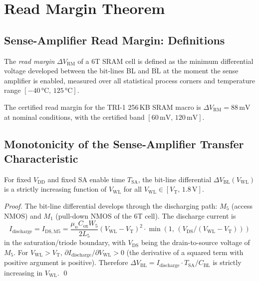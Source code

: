 \section{Read Margin Theorem}
\label{sec:wlboost-read-margin}

\subsection{Sense-Amplifier Read Margin: Definitions}

\begin{definition}
\label{def:read-margin}
The \emph{read margin} $\Delta V_{\mathrm{RM}}$ of a 6T SRAM cell is
defined as the minimum differential voltage developed between the
bit-lines BL and $\overline{\text{BL}}$ at the moment the sense
amplifier is enabled, measured over all statistical process corners
and temperature range $[-40\,\text{°C},\, 125\,\text{°C}]$.
\end{definition}

The certified read margin for the TRI-1 256\,KB SRAM macro is
$\Delta V_{\mathrm{RM}} = 88\,\text{mV}$ at nominal conditions, with
the certified band $[60\,\text{mV},\, 120\,\text{mV}]$.

\subsection{Monotonicity of the Sense-Amplifier Transfer Characteristic}

\begin{lemma}
\label{lem:monotone}
For fixed $V_{\mathrm{DD}}$ and fixed SA enable time $T_{\mathrm{SA}}$,
the bit-line differential $\Delta V_{\mathrm{BL}}(V_{\mathrm{WL}})$
is a strictly increasing function of $V_{\mathrm{WL}}$ for all
$V_{\mathrm{WL}} \in [V_{\mathrm{T}},\, 1.8\,\text{V}]$.
\end{lemma}

\begin{proof}
The bit-line differential develops through the discharging path:
$M_5$ (access NMOS) and $M_1$ (pull-down NMOS of the 6T cell).
The discharge current is
\[
  I_{\mathrm{discharge}}
  = I_{\mathrm{DS,M5}} = \frac{\mu_n C_{\mathrm{ox}} W_5}{2 L_5}
    (V_{\mathrm{WL}} - V_{\mathrm{T}})^{2}
    \cdot \min(1,\, (V_{\mathrm{DS}} / (V_{\mathrm{WL}}-V_{\mathrm{T}})))
\]
in the saturation/triode boundary, with $V_{\mathrm{DS}}$ being the
drain-to-source voltage of $M_5$.  For $V_{\mathrm{WL}} > V_{\mathrm{T}}$,
$\partial I_{\mathrm{discharge}} / \partial V_{\mathrm{WL}} > 0$
(the derivative of a squared term with positive argument is positive).
Therefore $\Delta V_{\mathrm{BL}} = I_{\mathrm{discharge}} \cdot T_{\mathrm{SA}}
/ C_{\mathrm{BL}}$ is strictly increasing in $V_{\mathrm{WL}}$.  \qed
\end{proof}

